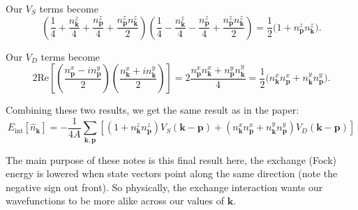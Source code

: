 \documentclass[12pt]{revtex4-2}
\newcommand{\real}{\text{Re}}
\begin{document}
Our $V_S$ terms become
\begin{equation}
    \left( \frac{1}{4} + \frac{n_\mathbf{k}^z}{4} + \frac{n_\mathbf{p}^z}{4} + \frac{n_\mathbf{p}^z n_\mathbf{k}^z}{2} \right)\left( \frac{1}{4} - \frac{n_\mathbf{k}^z}{4} - \frac{n_\mathbf{p}^z}{4} + \frac{n_\mathbf{p}^z n_\mathbf{k}^z}{2} \right) = \frac{1}{2}\big( 1 + n_\mathbf{p}^z n_\mathbf{k}^z \big).
\end{equation}

Our $V_D$ terms become
\begin{equation}
    2\real\left[ \left( \frac{n_\mathbf{p}^x - in_\mathbf{p}^y}{2} \right)\left( \frac{n_\mathbf{k}^x + in_\mathbf{k}^y}{2} \right) \right] = 2\frac{n_\mathbf{p}^x n_\mathbf{k}^x + n_\mathbf{p}^y n_\mathbf{k}^y}{4} = \frac{1}{2}\big( n_\mathbf{k}^x n_\mathbf{p}^x + n_\mathbf{k}^y n_\mathbf{p}^y \big).
\end{equation}

Combining these two results, we get the same result as in the paper:
\begin{equation}
    \boxed{ E_\text{int}[\hat{n}_\mathbf{k}] = -\frac{1}{4A} \sum_{\mathbf{k},\mathbf{p}} \left[ (1 + n_\mathbf{k}^z n_\mathbf{p}^z)V_S(\mathbf{k}-\mathbf{p}) + (n_\mathbf{k}^x n_\mathbf{p}^x + n_\mathbf{k}^y n_\mathbf{p}^y) V_D(\mathbf{k}-\mathbf{p}) \right] }
\end{equation}

The main purpose of these notes is this final result here, the exchange (Fock) energy is lowered when state vectors point along the same direction (note the negative sign out front).  So physically, the exchange interaction wants our wavefunctions to be more alike across our values of $\mathbf{k}$.
\end{document}
